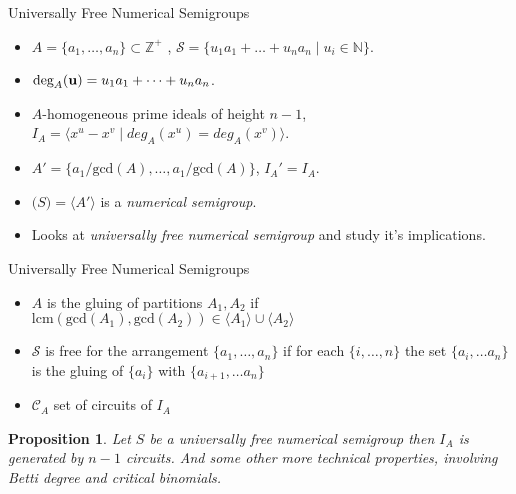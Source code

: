 \documentclass[9pt]{beamer}
\author{Antony Della Vecchia}
\title{}
\subtitle{Research Data in Discrete Mathematics}
\institute[]{
Technische Universit\"at Berlin
}
\date{
2023-03-22
}
\newcommand\set[1]{\{#1\}}
\newtheorem*{prop}{Proposition}
\newcommand{\ZZ}{\mathbb Z}
\theoremstyle{definition}
\begin{document}


\begin{frame}[fragile]{Universally Free Numerical Semigroups}
  
  \begin{itemize}
  \item $ A = \set{a_1, \dots, a_n} \subset \ZZ^+$  , $\mathcal{S} = \set{u_1a_1 + \dots + u_n a_n \mid u_i \in \mathbb{N}}$.
  \item $\text{deg}_A(\bold{u}) = u_1a_1 + \dots + u_n a_n$.
  \item $A$-homogeneous prime ideals of height $n-1$, $I_A = \langle x^u - x^v \mid deg_A(x^u) = deg_A(x^v) \rangle$.

  \item $A' = \set{a_1 / \text{gcd}(A), \dots, a_1 / \text{gcd}(A) }$, $I_A' = I_A$.
  \item $\mathcal(S) = \langle A' \rangle$ is a \emph{numerical semigroup}.
  \item Looks at \emph{universally free numerical semigroup} and study it's implications.
    
    
  \end{itemize}
\end{frame}


\begin{frame}[fragile]{Universally Free Numerical Semigroups}
  
  \begin{itemize}
  \item $A$ is the gluing of partitions $A_1, A_2$ if $\text{lcm}(\text{gcd}(A_1), \text{gcd}(A_2)) \in \langle A_1 \rangle \cup \langle A_2 \rangle$
  \item $\mathcal{S}$ is free for the arrangement $\set{a_1, \dots, a_n}$ if for each $\set{i, \dots, n}$ the set $\set{a_i, \dots a_n}$ is the gluing of $\set{a_i}$ with $\set{a_{i+1}, \dots a_n}$
  \item $\mathcal{C}_A$ set of circuits of $I_A$
  \end{itemize}

  \begin{prop}
    Let $S$ be a universally free numerical semigroup then $I_A$ is generated by $n-1$ circuits. And some other more technical properties, involving Betti degree and critical binomials.
  \end{prop}

\end{frame}
\end{document}
